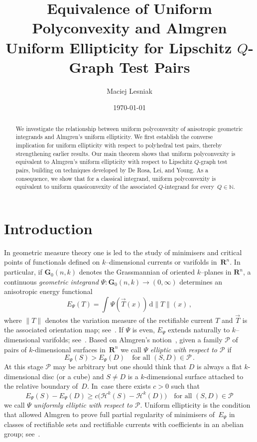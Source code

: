 \documentclass[a4paper,twoside,reqno]{article}
\date{\today}
\title{
    Equivalence of Uniform Polyconvexity and Almgren Uniform Ellipticity for 
    Lipschitz $Q$-Graph Test Pairs
}
\author{
    Maciej Lesniak
}
\theoremstyle{definition}
\theoremstyle{remark}
\theoremstyle{plain}
\theoremstyle{remark}
\theoremstyle{definition}
\newcommand{\ograss}[2]{\mathbf{G}_0(#1,#2)}
\renewcommand{\textint}[2]{{\textstyle\int_{#1}^{#2}}}
\newcommand{\textint}[2]{{\textstyle\int_{#1}^{#2}}}
\newcommand{\natp}{\mathbb{N}}
\newcommand{\R}{\mathbf{R}}
\newcommand{\HM}{\mathscr{H}}
\newcommand{\ud}{\ensuremath{\,\mathrm{d}}}
\begin{document}
\maketitle

\begin{abstract}
    We investigate the relationship between uniform polyconvexity of anisotropic geometric 
    integrands and Almgren's uniform ellipticity. We first establish the converse 
    implication for uniform ellipticity with respect to polyhedral test pairs, 
    thereby strengthening earlier results. Our main theorem shows that uniform 
    polyconvexity is equivalent to Almgren's uniform ellipticity with respect to 
    Lipschitz $Q$-graph test pairs, building on techniques developed by De Rosa, Lei, 
    and Young. As a consequence, we show that for a classical integrand, uniform 
    polyconvexity is equivalent to uniform quasiconvexity of the associated 
    $Q$-integrand for every~$Q \in \natp$.
\end{abstract}

\section{Introduction}
\hfill

In geometric measure theory one is led to the study of minimisers and critical
points of functionals defined on $k$--dimensional currents or varifolds
in~$\R^n$. In particular, if $\ograss{n}{k}$ denotes the Grassmannian of
oriented $k$--planes in $\R^n$, a continuous \emph{geometric integrand}
$\Psi : \ograss{n}{k} \to (0,\infty)$ determines an anisotropic energy
functional
\begin{displaymath}
    E_{\Psi}(T) = \textint{}{} \Psi(\vec T(x)) \ud \|T\|(x) \,,
\end{displaymath}
where $\|T\|$ denotes the variation measure of the rectifiable current $T$ and
$\vec T$ is the associated orientation map; see~\cite[2.5.12, 4.1.5,
4.1.7]{Federer1969}. If $\Psi$ is even, $E_{\Psi}$ extends naturally to
$k$--dimensional varifolds; see~\cite{Allard1972}. Based on Almgren's
notion~\cite[1.2, 1.6(2)]{Almgren1968}, given a family $\mathcal{P}$ of pairs of
$k$-dimensional surfaces in~$\R^n$ we call $\Psi$ \emph{elliptic with respect to
  $\mathcal{P}$} if
\begin{displaymath}
    E_{\Psi}(S) > E_{\Psi}(D)
    \quad \text{for all $(S,D) \in \mathcal{P}$} \,.
\end{displaymath}
At this stage $\mathcal{P}$ may be arbitrary but one should think that $D$ is
always a flat $k$-dimensional disc (or a cube) and $S \ne D$ is a
$k$-dimensional surface attached to the relative boundary of~$D$. In~case there
exists $c > 0$ such that
\begin{displaymath}
    E_{\Psi}(S) - E_{\Psi}(D) \ge c \bigl( \HM^k(S) - \HM^k(D) \bigr)
    \quad \text{for all $(S,D) \in \mathcal{P}$} 
\end{displaymath}
we call $\Psi$ \emph{uniformly elliptic with respect to $\mathcal{P}$}. Uniform
ellipticity is the condition that allowed Almgren to prove full partial
regularity of minimisers of~$E_{\Psi}$ in classes of rectifiable sets and
rectifiable currents with coefficients in an abelian group; see~\cite[1.4,
1.7]{Almgren1968}.
\end{document}
